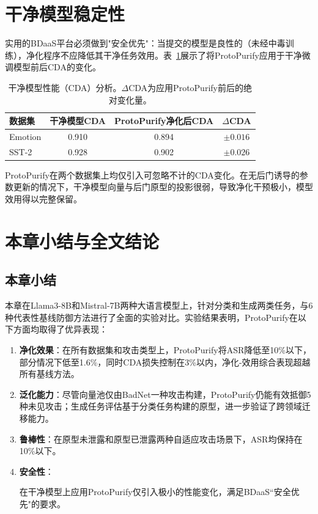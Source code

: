 \section{干净模型稳定性}

实用的BDaaS平台必须做到"安全优先"：当提交的模型是良性的（未经中毒训练），净化程序不应降低其干净任务效用。表~\ref{tab:clean}展示了将ProtoPurify应用于干净微调模型前后CDA的变化。

\begin{table}[htbp]
\centering
\caption{干净模型性能（CDA）分析。$\Delta$CDA为应用ProtoPurify前后的绝对变化量。}
\label{tab:clean}
\begin{tabular}{lccc}
\toprule
数据集 & 干净模型CDA & ProtoPurify净化后CDA & $\Delta$CDA \\
\midrule
Emotion & 0.910 & 0.894 & $\pm 0.016$ \\
SST-2   & 0.928 & 0.902 & $\pm 0.026$ \\
\bottomrule
\end{tabular}
\end{table}

ProtoPurify在两个数据集上均仅引入可忽略不计的CDA变化。在无后门诱导的参数更新的情况下，干净模型向量与后门原型的投影很弱，导致净化干预极小，模型效用得以完整保留。

\section{本章小结与全文结论}

\subsection{本章小结}

本章在Llama3-8B和Mistral-7B两种大语言模型上，针对分类和生成两类任务，与6种代表性基线防御方法进行了全面的实验对比。实验结果表明，ProtoPurify在以下方面均取得了优异表现：

\begin{enumerate}[leftmargin=2em]
    \item \textbf{净化效果}：在所有数据集和攻击类型上，ProtoPurify将ASR降低至10\%以下，部分情况下低至1.6\%，同时CDA损失控制在3\%以内，净化-效用综合表现超越所有基线方法。

    \item \textbf{泛化能力}：尽管向量池仅由BadNet一种攻击构建，ProtoPurify仍能有效抵御5种未见攻击；生成任务评估基于分类任务构建的原型，进一步验证了跨领域迁移能力。

    \item \textbf{鲁棒性}：在原型未泄露和原型已泄露两种自适应攻击场景下，ASR均保持在10\%以下。

    \item \textbf{安全性}：{\sloppy 在干净模型上应用ProtoPurify仅引入极小的性能变化，满足BDaaS``安全优先"的要求。\par}
\end{enumerate}


